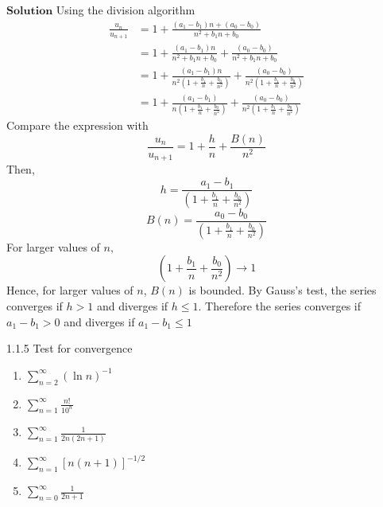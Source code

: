 $\boxed{\textbf{Solution}}$ Using the division algorithm
$$
\begin{aligned}
\frac{u_{n}}{u_{n+1}} &=1+\frac{\left(a_{1}-b_{1}\right) n+\left(a_{0}-b_{0}\right)}{n^{2}+b_{1} n+b_{0}} \\
&=1+\frac{\left(a_{1}-b_{1}\right) n}{n^{2}+b_{1} n+b_{0}}+\frac{\left(a_{0}-b_{0}\right)}{n^{2}+b_{1} n+b_{0}} \\
&=1+\frac{\left(a_{1}-b_{1}\right) n}{n^{2}\left(1+\frac{b_{1}}{n}+\frac{b_{0}}{n^{2}}\right)}+\frac{\left(a_{0}-b_{0}\right)}{n^{2}\left(1+\frac{b_{1}}{n}+\frac{b_{0}}{n^{2}}\right)} \\
&=1+\frac{\left(a_{1}-b_{1}\right)}{n\left(1+\frac{b_{1}}{n}+\frac{b_{0}}{n^{2}}\right)}+\frac{\left(a_{0}-b_{0}\right)}{n^{2}\left(1+\frac{b_{1}}{n}+\frac{b_{0}}{n^{2}}\right)}
\end{aligned}
$$
Compare the expression with 
$$\frac{u_{n}}{u_{n+1}}=1+\frac{h}{n}+\frac{B(n)}{n^{2}}$$
Then, 
$$h=\frac{a_{1}-b_{1}}{\left(1+\frac{b_{1}}{n}+\frac{b_{0}}{n^{2}}\right)}$$
$$B(n)=\frac{a_{0}-b_{0}}{\left(1+\frac{b_{1}}{n}+\frac{b_{0}}{n^{2}}\right)}$$
For larger values of $n,$
$$\left(1+\frac{b_{1}}{n}+\frac{b_{0}}{n^{2}}\right) \rightarrow 1$$
Hence, for larger values of $n$, $B(n)$ is bounded. By Gauss's test, the series converges if $h>1$ and diverges if $h \leq 1$.
Therefore the series converges if $a_{1}-b_{1}>0$ and diverges if $a_{1}-b_{1} \leq 1$





\newpage



\begin{mybox}{1.1.5}
Test for convergence

\begin{multicols}{2}
\begin{enumerate}[$(a)$]
\item $\displaystyle \sum_{n=2}^{\infty}(\ln n)^{-1}$
\item $\displaystyle \sum_{n=1}^{\infty} \frac{n !}{10^{n}}$
\item $\displaystyle \sum_{n=1}^{\infty} \frac{1}{2 n(2 n+1)}$
\item $\displaystyle \sum_{n=1}^{\infty}[n(n+1)]^{-1 / 2}$
\item $\displaystyle \sum_{n=0}^{\infty} \frac{1}{2 n+1}$
\end{enumerate}
\end{multicols}
\end{mybox}


